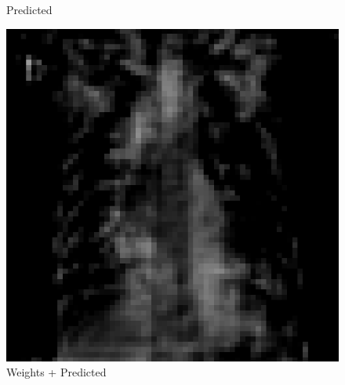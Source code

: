 \documentclass{article}
\begin{document}
\begin{figure}[!ht]
  \caption*{Predicted}\label{fig:training-1-predicted}
\endminipage
\xspace
{}%
  \includegraphics[width=\linewidth]{assets/perceptron/training-1-add.png}
  \caption*{Weights + Predicted}\label{fig:train-1-subtract}
\endminipage
\end{figure}
\newpage
\end{document}
